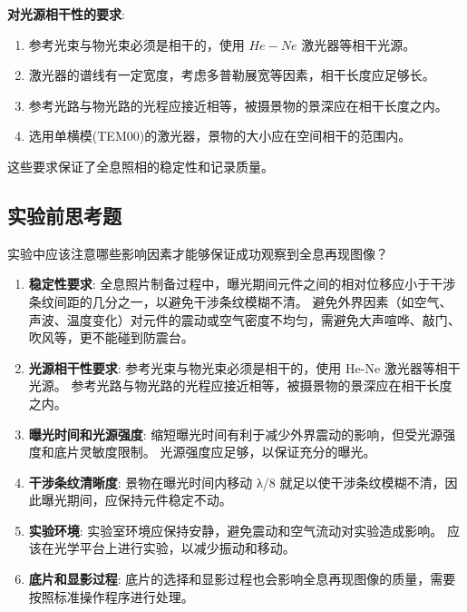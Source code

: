 \documentclass[dvipsnames, svgnames,a4paper,11pt]{article}
\begin{document}
\begin{enumerate}
			\textbf{对光源相干性的要求}:
				\begin{enumerate}[label=\roman*.]
					\item 参考光束与物光束必须是相干的，使用 $He-Ne$ 激光器等相干光源。
					\item 激光器的谱线有一定宽度，考虑多普勒展宽等因素，相干长度应足够长。
					\item 参考光路与物光路的光程应接近相等，被摄景物的景深应在相干长度之内。
					\item 选用单横模(TEM00)的激光器，景物的大小应在空间相干的范围内。
				\end{enumerate}

			 这些要求保证了全息照相的稳定性和记录质量。

	\end{enumerate}

\subsection{实验前思考题}
	\begin{question}
		实验中应该注意哪些影响因素才能够保证成功观察到全息再现图像？
	\end{question}
		
		\begin{enumerate}[label=\roman*.]
			\item \textbf{稳定性要求}:
			全息照片制备过程中，曝光期间元件之间的相对位移应小于干涉条纹间距的几分之一，以避免干涉条纹模糊不清。
			避免外界因素（如空气、声波、温度变化）对元件的震动或空气密度不均匀，需避免大声喧哗、敲门、吹风等，更不能碰到防震台。
			
			\item \textbf{光源相干性要求}:	
			参考光束与物光束必须是相干的，使用 He-Ne 激光器等相干光源。
			参考光路与物光路的光程应接近相等，被摄景物的景深应在相干长度之内。

			\item \textbf{曝光时间和光源强度}:
			缩短曝光时间有利于减少外界震动的影响，但受光源强度和底片灵敏度限制。
			光源强度应足够，以保证充分的曝光。

			\item \textbf{干涉条纹清晰度}:
			景物在曝光时间内移动 λ/8 就足以使干涉条纹模糊不清，因此曝光期间，应保持元件稳定不动。
			
			\item \textbf{实验环境}:
			实验室环境应保持安静，避免震动和空气流动对实验造成影响。
			应该在光学平台上进行实验，以减少振动和移动。

			\item \textbf{底片和显影过程}:
			底片的选择和显影过程也会影响全息再现图像的质量，需要按照标准操作程序进行处理。
			
		\end{enumerate}
	
\end{document}
